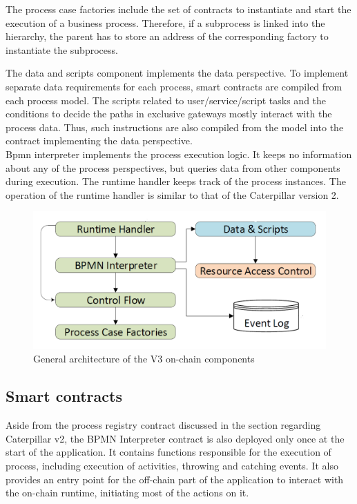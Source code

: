 The process case factories include the set of contracts to instantiate and start the execution of a business process. Therefore, if a subprocess is linked into the hierarchy, the parent has to store an address of the corresponding factory to instantiate the subprocess.

The data and scripts component implements the data perspective. To implement separate data requirements for each process, smart contracts are compiled from each process model. The scripts related to user/service/script tasks and the conditions to decide the paths in exclusive gateways mostly interact with the process data. Thus, such instructions are also compiled from the model into the contract implementing the data perspective.\\

Bpmn interpreter implements the process execution logic. It keeps no information about any of the process perspectives, but queries data from other components during execution. The runtime handler keeps track of the process instances. The operation of the runtime handler is similar to that of the Caterpillar version 2.

\begin{figure}[hbt]
	\includegraphics[width=\textwidth]{gfx/caterpillar-interpretation-architecture}
	\caption{General architecture of the V3 on-chain components}
	\label{fig:caterpillar:v3:architecture}
\end{figure}

\subsection{Smart contracts}
\label{sec:caterpillar:v3:contracts}

Aside from the process registry contract discussed in the section regarding Caterpillar v2, the BPMN Interpreter contract is also deployed only once at the start of the application. It contains functions responsible for the execution of process, including execution of activities, throwing and catching events. It also provides an entry point for the off-chain part of the application to interact with the on-chain runtime, initiating most of the actions on it.

